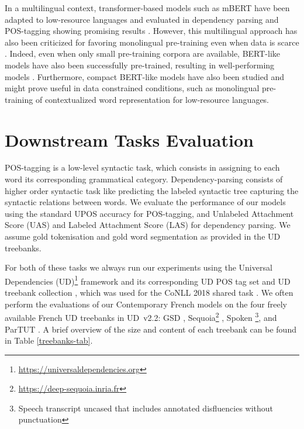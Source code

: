 In a multilingual context, transformer-based models such as mBERT have been adapted to low-resource languages and evaluated in dependency parsing and POS-tagging showing promising results \citep{chau-etal-2020-parsing, muller-etal-2021-unseen, gururangan-etal-2020-dont, wang-etal-2020-extending}. However, this multilingual approach has also been criticized for favoring monolingual pre-training even when data is scarce \citep{virtanen-etal-2019-multilingual, ortiz-suarez-etal-2020-monolingual}. Indeed, even when only small pre-training corpora are available, BERT-like models have also been successfully pre-trained, resulting in well-performing models \citep{micheli-etal-2020-importance}. Furthermore, compact BERT-like models have also been studied \citep{turc-etal-2019-well} and might prove useful in data constrained conditions, such as monolingual pre-training of contextualized word representation for low-resource languages.

\section{Downstream Tasks Evaluation}\label{MethodEVAL}

POS-tagging is a low-level syntactic task, which consists in assigning to each word its corresponding grammatical category. Dependency-parsing consists of higher order syntactic task like predicting the labeled syntactic tree capturing the syntactic relations between words. We evaluate the performance of our models using the standard UPOS accuracy for POS-tagging, and Unlabeled Attachment Score (UAS) and Labeled Attachment Score (LAS) for dependency parsing. We assume gold tokenisation and gold word segmentation as provided in the UD treebanks.

For both of these tasks we always run our experiments using the Universal Dependencies (UD)\footnote{\url{https://universaldependencies.org}} framework and its corresponding UD POS tag set \citep{petrov-etal-2012-universal} and UD treebank collection \citep{nivre-etal-2018-universal}, which was used for the CoNLL 2018 shared task \citep{seker-etal-2018-universal}. We often perform the evaluations of our Contemporary French models on the four freely available French UD treebanks in UD~v2.2: GSD \citep{mcdonald-etal-2013-universal}, Sequoia\footnote{\url{https://deep-sequoia.inria.fr}} \citep{candito-seddah-2012-le,candito-etal-2014-deep}, Spoken \citep{lacheret-etal-2014-rhapsodie,bawden-etal-2014-correcting}\footnote{Speech transcript uncased that includes annotated disfluencies without punctuation}, and ParTUT \citep{sanguinetti-Bosco-2015-parttut}. A brief overview of the size and content of each treebank can be found in Table \ref{treebanks-tab}.

